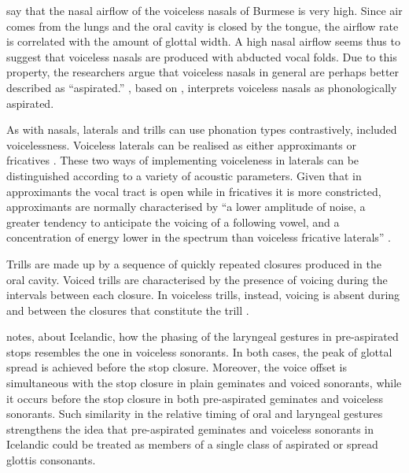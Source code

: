 \documentclass[11pt,a4paper,oneside,openany]{memoir}\usepackage[]{graphicx}\usepackage[]{color}
\begin{document}
\citet[p. 111]{ladefoged1996} say that the nasal airflow of the voiceless nasals of Burmese is very high.
Since air comes from the lungs and the oral cavity is closed by the tongue, the airflow rate is correlated with the amount of glottal width.
A high nasal airflow seems thus to suggest that voiceless nasals are produced with abducted vocal folds.
Due to this property, the researchers argue that voiceless nasals in general are perhaps better described as ``aspirated.''
\citet[p. 82]{kehrein2002}, based on \citet{ladefoged1996}, interprets voiceless nasals as phonologically aspirated.


As with nasals, laterals and trills can use phonation types contrastively, included voicelessness.
Voiceless laterals can be realised as either approximants or fricatives \citep{ladefoged1996}.
These two ways of implementing voiceleness in laterals can be distinguished according to a variety of acoustic parameters.
Given that in approximants the vocal tract is open while in fricatives it is more constricted, approximants are normally characterised by ``a lower amplitude of noise, a greater tendency to anticipate the voicing of a following vowel, and a concentration of energy lower in the spectrum than voiceless fricative laterals'' \citep[p. 198]{ladefoged1996}.

Trills are made up by a sequence of quickly repeated closures produced in the oral cavity.
Voiced trills are characterised by the presence of voicing during the intervals between each closure.
In voiceless trills, instead, voicing is absent during and between the closures that constitute the trill \citep[p. 236]{ladefoged1996}.

\citet{helgason2002} notes, about Icelandic, how the phasing of the laryngeal gestures in pre-aspirated stops resembles the one in voiceless sonorants.
In both cases, the peak of glottal spread is achieved before the stop closure.
Moreover, the voice offset is simultaneous with the stop closure in plain geminates and voiced sonorants, while it occurs before the stop closure in both pre-aspirated geminates and voiceless sonorants.
Such similarity in the relative timing of oral and laryngeal gestures strengthens the idea that pre-aspirated geminates and voiceless sonorants in Icelandic could be treated as members of a single class of aspirated or spread glottis consonants.
\end{document}
